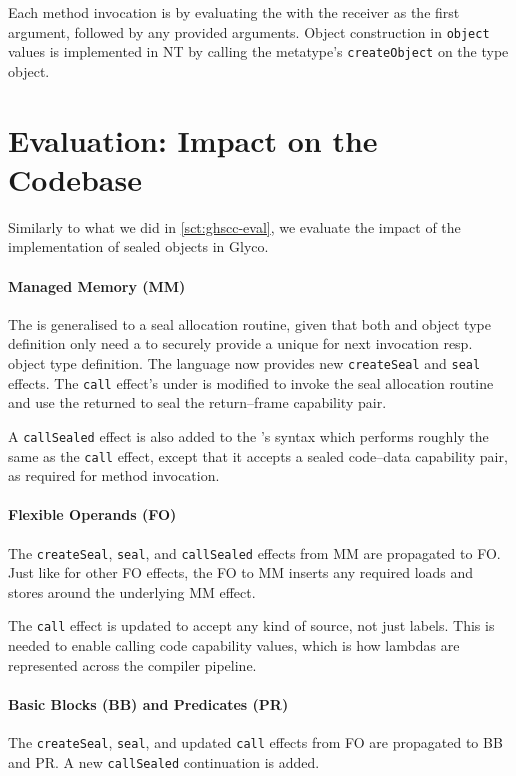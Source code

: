\documentclass[main.tex]{subfiles}
\begin{document}
Each method invocation is \lowered{} by evaluating the  with the receiver as the first argument, followed by any provided arguments. Object construction in \texttt{object} values is implemented in NT by calling the metatype's \texttt{createObject}  on the type object.

\section{Evaluation: Impact on the Codebase} \label{sct:obj-eval}
Similarly to what we did in \cref{sct:ghscc-eval}, we evaluate the impact of the implementation of sealed objects in Glyco.

\paragraph{Managed Memory (MM)} The   is generalised to a seal allocation routine, given that both  and object type definition only need a  to securely provide a unique  for next invocation resp. object type definition. The language now provides new \texttt{createSeal} and \texttt{seal} effects. The \texttt{call} effect's  under  is modified to invoke the seal allocation routine and use the returned  to seal the return–frame capability pair.

A \texttt{callSealed} effect is also added to the 's syntax which performs roughly the same as the \texttt{call} effect, except that it accepts a sealed code–data capability pair, as required for method invocation.

\paragraph{Flexible Operands (FO)} The \texttt{createSeal}, \texttt{seal}, and \texttt{callSealed} effects from MM are propagated to FO. Just like for other FO effects, the FO to MM  inserts any required loads and stores around the underlying MM effect.

The \texttt{call} effect is updated to accept any kind of source, not just labels. This is needed to enable calling code capability values, which is how lambdas are represented across the compiler pipeline.

\paragraph{Basic Blocks (BB) and Predicates (PR)} The \texttt{createSeal}, \texttt{seal}, and updated \texttt{call} effects from FO are propagated to BB and PR. A new \texttt{callSealed} continuation is added.
\end{document}
